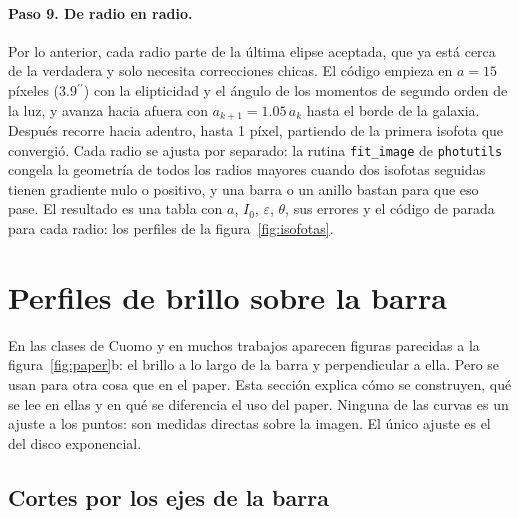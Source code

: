 \documentclass[11pt,a4paper]{article}
\newcommand{\as}{\ensuremath{^{\prime\prime}}}
\newcommand{\code}[1]{\texttt{#1}}
\begin{document}
\paragraph{Paso 9. De radio en radio.} Por lo anterior, cada radio parte de la última elipse aceptada, que ya
está cerca de la verdadera y solo necesita correcciones chicas. El código empieza en $a = 15$ píxeles
($3.9\as$) con la elipticidad y el ángulo de los momentos de segundo orden de la luz, y avanza hacia afuera con
$a_{k+1} = 1.05\,a_k$ hasta el borde de la galaxia. Después recorre hacia adentro, hasta 1 píxel, partiendo de la
primera isofota que convergió. Cada radio se ajusta por separado: la rutina \code{fit\_image} de \code{photutils}
congela la geometría de todos los radios mayores cuando dos isofotas seguidas tienen gradiente nulo o positivo,
y una barra o un anillo bastan para que eso pase. El resultado es una tabla con $a$, $I_0$, $\varepsilon$,
$\theta$, sus errores y el código de parada para cada radio: los perfiles de la figura~\ref{fig:isofotas}.




\section{Perfiles de brillo sobre la barra}\label{sec:figuras}

En las clases de Cuomo y en muchos trabajos aparecen figuras parecidas a la figura~\ref{fig:paper}b: el brillo
a lo largo de la barra y perpendicular a ella. Pero se usan para otra cosa que en el paper. Esta sección explica
cómo se construyen, qué se lee en ellas y en qué se diferencia el uso del paper. Ninguna de las curvas es un
ajuste a los puntos: son medidas directas sobre la imagen. El único ajuste es el del disco exponencial.

\subsection{Cortes por los ejes de la barra}
\end{document}
